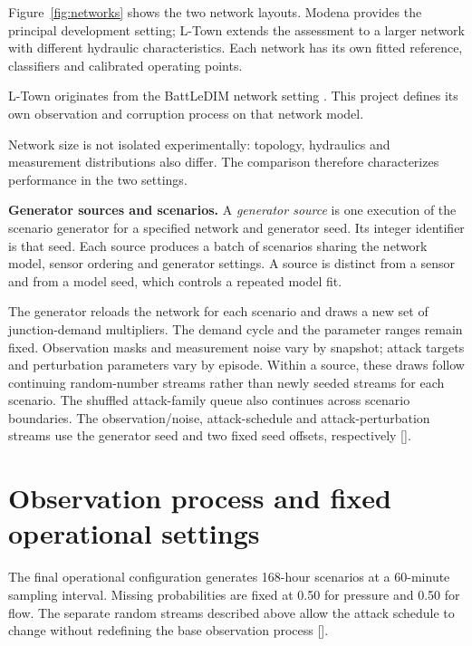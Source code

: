 
Figure~\ref{fig:networks} shows the two network layouts. Modena provides the principal development setting; L-Town extends the assessment to a larger network with different hydraulic characteristics. Each network has its own fitted reference, classifiers and calibrated operating points.

L-Town originates from the BattLeDIM network setting \cite{battledim}. This project defines its own observation and corruption process on that network model.

Network size is not isolated experimentally: topology, hydraulics and measurement distributions also differ. The comparison therefore characterizes performance in the two settings.

\noindent\textbf{Generator sources and scenarios.}
A \emph{generator source} is one execution of the scenario generator for a specified network and generator seed. Its integer identifier is that seed. Each source produces a batch of scenarios sharing the network model, sensor ordering and generator settings. A source is distinct from a sensor and from a model seed, which controls a repeated model fit.

The generator reloads the network for each scenario and draws a new set of junction-demand multipliers. The demand cycle and the parameter ranges remain fixed. Observation masks and measurement noise vary by snapshot; attack targets and perturbation parameters vary by episode. Within a source, these draws follow continuing random-number streams rather than newly seeded streams for each scenario. The shuffled attack-family queue also continues across scenario boundaries. The observation/noise, attack-schedule and attack-perturbation streams use the generator seed and two fixed seed offsets, respectively [].

\section{Observation process and fixed operational settings}
The final operational configuration generates 168-hour scenarios at a 60-minute sampling interval. Missing probabilities are fixed at 0.50 for pressure and 0.50 for flow. The separate random streams described above allow the attack schedule to change without redefining the base observation process [].

